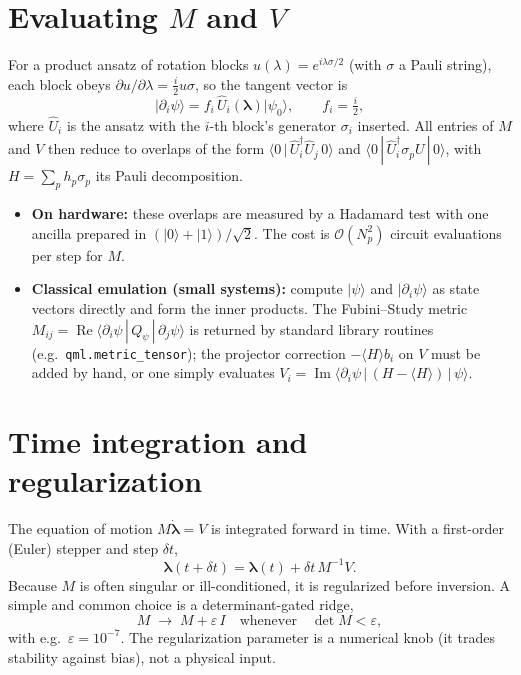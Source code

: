 \documentclass[12pt,a4paper]{article}
\newcommand{\ket}[1]{\lvert #1 \rangle}
\newcommand{\braket}[2]{\langle #1 \,|\, #2 \rangle}
\newcommand{\mel}[3]{\langle #1 \,|\, #2 \,|\, #3 \rangle}
\newcommand{\re}{\operatorname{Re}}
\newcommand{\im}{\operatorname{Im}}
\newcommand{\dlam}{\dot{\boldsymbol{\lambda}}}
\begin{document}
\section{Evaluating $M$ and $V$}\label{sec:eval}

For a product ansatz of rotation blocks $u(\lambda)=e^{i\lambda\sigma/2}$ (with $\sigma$ a Pauli
string), each block obeys $\partial u/\partial\lambda=\tfrac{i}{2}u\sigma$, so the tangent vector is
\begin{equation}
  \ket{\partial_i\psi}=f_i\,\hat U_i(\boldsymbol{\lambda})\ket{\psi_0},\qquad f_i=\tfrac{i}{2},
  \label{eq:struct}
\end{equation}
where $\hat U_i$ is the ansatz with the $i$-th block's generator $\sigma_i$ inserted. All entries of
$M$ and $V$ then reduce to overlaps of the form $\braket{0}{\hat U_i^\dagger \hat U_j\,0}$ and
$\mel{0}{\hat U_i^\dagger\sigma_p U}{0}$, with $H=\sum_p h_p\sigma_p$ its Pauli decomposition.

\begin{itemize}[leftmargin=1.4em]
  \item \textbf{On hardware:} these overlaps are measured by a Hadamard test with one ancilla
  prepared in $(\ket{0}+\ket{1})/\sqrt2$. The cost is $\mathcal{O}(N_p^2)$ circuit evaluations per
  step for $M$.
  \item \textbf{Classical emulation (small systems):} compute $\ket{\psi}$ and $\ket{\partial_i\psi}$
  as state vectors directly and form the inner products. The Fubini--Study metric
  $M_{ij}=\re\mel{\partial_i\psi}{Q_\psi}{\partial_j\psi}$ is returned by standard library routines
  (e.g.\ \texttt{qml.metric\_tensor}); the projector correction $-\langle H\rangle b_i$ on $V$ must
  be added by hand, or one simply evaluates $V_i=\im\mel{\partial_i\psi}{(H-\langle H\rangle)}{\psi}$.
\end{itemize}

\section{Time integration and regularization}\label{sec:integrate}

The equation of motion $M\dlam=V$ is integrated forward in time. With a first-order (Euler) stepper
and step $\delta t$,
\begin{equation}
  \boldsymbol{\lambda}(t+\delta t)=\boldsymbol{\lambda}(t)+\delta t\,M^{-1}V .
  \label{eq:euler}
\end{equation}
Because $M$ is often singular or ill-conditioned, it is regularized before inversion. A simple and
common choice is a determinant-gated ridge,
\begin{equation}
  M\;\longrightarrow\;M+\varepsilon\, I \quad\text{whenever}\quad \det M<\varepsilon,
  \label{eq:reg}
\end{equation}
with e.g.\ $\varepsilon=10^{-7}$. The regularization parameter is a numerical knob (it trades
stability against bias), not a physical input.
\end{document}
